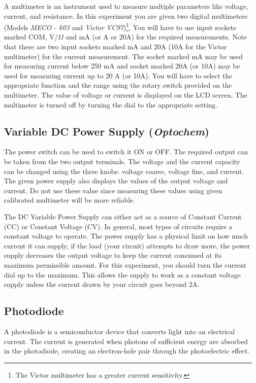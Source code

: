 A multimeter is an instrument used to measure multiple parameters like voltage, current, and resistance. In this experiment you are given two digital multimeters (Models \textit{MECO - 603} and \textit{Victor VC97})\footnote{The Victor multimeter has a greater current sensitivity.}. You will have to use input sockets marked COM, V/$\Omega$ and mA (or A or 20A) for the required measurements. Note that there are two input sockets marked mA and 20A (10A for the Victor multimeter) for the current measurement. The socket marked mA may be used for measuring current below 250 mA and socket marked 20A (or 10A) may be used for measuring current up to 20 A (or 10A). You will have to select the appropriate function and the range using the rotary switch provided on the multimeter. The value of voltage or current is displayed on the LCD screen. The multimeter is turned off by turning the dial to the appropriate setting.

\subsection*{Variable DC Power Supply (\textit{Optochem})}

The power switch can be used to switch it ON or OFF. The required output can be taken from the two output terminals. The voltage and the current capacity can be changed using the three knobs: voltage coarse, voltage fine, and current. The given power supply also displays the values of the output voltage and current. Do not use these value since measuring these values using given calibrated multimeter will be more reliable. 

The DC Variable Power Supply can either act as a source of Constant Current (CC) or Constant Voltage (CV). In general, most types of circuits require a constant voltage to operate. The power supply has a physical limit on how much current it can supply, if the load (your circuit) attempts to draw more, the power supply decreases the output voltage to keep the current consumed at its maximum permissible amount. For this experiment, you should turn the current dial up to the maximum. This allows the supply to work as a constant voltage supply unless the current drawn by your circuit goes beyond 2A.

\subsection*{Photodiode}

A photodiode is a semiconductor device that converts light into an electrical current. The current is generated when photons of sufficient energy are absorbed in the photodiode, creating an electron-hole pair through the photoelectric effect.

